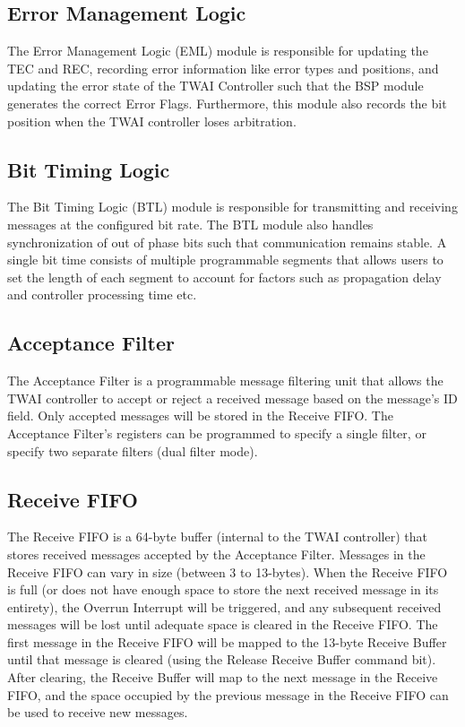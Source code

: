 \documentclass[main\_\_EN.tex]{subfiles}
\begin{document}
\subsection{Error Management Logic}
The Error Management Logic (EML) module is responsible for updating the TEC and REC, recording error information like error types and positions, and updating the error state of the TWAI Controller such that the BSP module generates the correct Error Flags. Furthermore, this module also records the bit position when the TWAI controller loses arbitration.

\subsection{Bit Timing Logic}
The Bit Timing Logic (BTL) module is responsible for transmitting and receiving messages at the configured bit rate. The BTL module also handles synchronization of out of phase bits such that communication remains stable. A single bit time consists of multiple programmable segments that allows users to set the length of each segment to account for factors such as propagation delay and controller processing time etc.

\subsection{Acceptance Filter}
The Acceptance Filter is a programmable message filtering unit that allows the TWAI controller to accept or reject a received message based on the message’s ID field. Only accepted messages will be stored in the Receive FIFO. The Acceptance Filter’s registers can be programmed to specify a single filter, or specify two separate filters (dual filter mode).

\subsection{Receive FIFO}
The Receive FIFO is a 64-byte buffer (internal to the TWAI controller) that stores received messages accepted by the Acceptance Filter. Messages in the Receive FIFO can vary in size (between 3 to 13-bytes). When the Receive FIFO is full (or does not have enough space to store the next received message in its entirety), the Overrun Interrupt will be triggered, and any subsequent received messages will be lost until adequate space is cleared in the Receive FIFO. The first message in the Receive FIFO will be mapped to the 13-byte Receive Buffer until that message is cleared (using the Release Receive Buffer command bit). After clearing, the Receive Buffer will map to the next message in the Receive FIFO, and the space occupied by the previous message in the Receive FIFO can be used to receive new messages.
\end{document}
